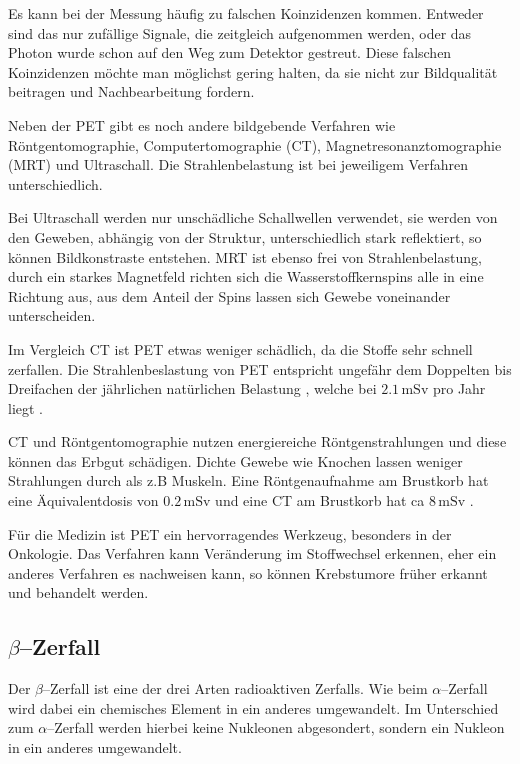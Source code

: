 \documentclass[12pt,a4paper]{scrartcl}
\numberwithin{equation}{section} %
\newcommand{\pu}[1]{\ensuremath{\mathrm{#1}}}
\begin{document}
Es kann bei der Messung häufig zu falschen Koinzidenzen kommen. Entweder sind das nur zufällige Signale, die zeitgleich aufgenommen werden, oder das Photon wurde schon auf den Weg zum Detektor gestreut. Diese falschen Koinzidenzen möchte man möglichst gering halten, da sie nicht zur Bildqualität beitragen und Nachbearbeitung fordern.

Neben der PET gibt es noch andere bildgebende Verfahren wie Röntgentomographie, Computertomographie (CT), Magnetresonanztomographie (MRT) und Ultraschall. Die Strahlenbelastung ist bei jeweiligem Verfahren unterschiedlich.

Bei Ultraschall werden nur unschädliche Schallwellen verwendet, sie werden von den Geweben, abhängig von der Struktur, unterschiedlich stark reflektiert, so können Bildkonstraste entstehen. MRT ist ebenso frei von Strahlenbelastung, durch ein starkes Magnetfeld richten sich die Wasserstoffkernspins alle in eine Richtung aus, aus dem Anteil der Spins lassen sich Gewebe voneinander unterscheiden.

Im Vergleich CT ist PET etwas weniger schädlich, da die Stoffe sehr schnell zerfallen. Die Strahlenbeslastung von PET entspricht ungefähr dem Doppelten bis Dreifachen der jährlichen natürlichen Belastung \cite{DGNM}, welche bei $\pu{2.1 \,mSv}$ pro Jahr liegt \cite{SSK}.

CT und Röntgentomographie nutzen energiereiche Röntgenstrahlungen und diese können das Erbgut schädigen. Dichte Gewebe wie Knochen lassen weniger Strahlungen durch als z.B Muskeln. Eine Röntgenaufnahme am Brustkorb hat eine Äquivalentdosis von $\pu{0.2 \,mSv}$ und eine CT am Brustkorb hat ca $\pu{8 \,mSv}$ \cite{SSK}.

Für die Medizin ist PET ein hervorragendes Werkzeug, besonders in der Onkologie. Das Verfahren kann Veränderung im Stoffwechsel erkennen, eher ein anderes Verfahren es nachweisen kann, so können Krebstumore früher erkannt und behandelt werden.

\hypertarget{betazerfall}{%
\subsection{\texorpdfstring{$\beta$--Zerfall}{\textbackslash beta--Zerfall}}\label{betazerfall}}

Der $\beta$--Zerfall ist eine der drei Arten radioaktiven Zerfalls. Wie beim $\alpha$--Zerfall wird dabei ein chemisches Element in ein anderes umgewandelt. Im Unterschied zum $\alpha$--Zerfall werden hierbei keine Nukleonen abgesondert, sondern ein Nukleon in ein anderes umgewandelt.
\end{document}
